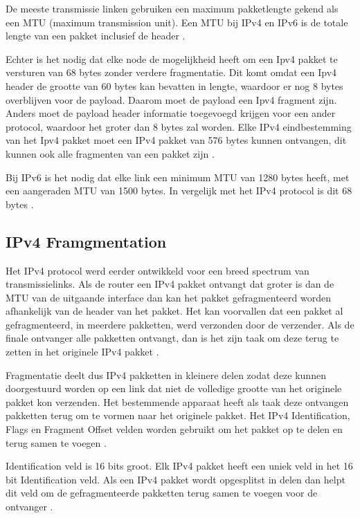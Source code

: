 De meeste transmissie linken gebruiken een maximum pakketlengte gekend als een MTU (maximum transmission unit). Een MTU bij IPv4 en IPv6 is de totale lengte van een pakket inclusief de header \autocite{Graziani2017}. 

Echter is het nodig dat elke node de mogelijkheid heeft om een Ipv4 pakket te versturen van 68 bytes zonder verdere fragmentatie. Dit komt omdat een Ipv4 header de grootte van 60 bytes kan bevatten in lengte, waardoor er nog 8 bytes overblijven voor de payload. Daarom moet de payload een Ipv4 fragment zijn. Anders moet de payload header informatie toegevoegd krijgen voor een ander protocol, waardoor het groter dan 8 bytes zal worden. Elke IPv4 eindbestemming van het Ipv4 pakket moet een IPv4 pakket van 576 bytes kunnen ontvangen, dit kunnen ook alle fragmenten van een pakket zijn \autocite{Graziani2017}.

Bij IPv6 is het nodig dat elke link een minimum MTU van 1280 bytes heeft, met een aangeraden MTU van 1500 bytes. In vergelijk met het IPv4 protocol is dit 68 bytes \autocite{Graziani2017}.

\subsection{IPv4 Framgmentation}

Het IPv4 protocol werd eerder ontwikkeld voor een breed spectrum van transmissielinks. Als de router een IPv4 pakket ontvangt dat groter is dan de MTU van de uitgaande interface dan kan het pakket gefragmenteerd worden afhankelijk van de header van het pakket. Het kan voorvallen dat een pakket al gefragmenteerd, in meerdere pakketten, werd verzonden door de verzender. Als de finale ontvanger alle pakketten ontvangt, dan is het zijn taak om deze terug te zetten in het originele IPv4 pakket \autocite{Graziani2017}.

Fragmentatie deelt dus IPv4 pakketten in kleinere delen zodat deze kunnen doorgestuurd worden op een link dat niet de volledige grootte van het originele pakket kon verzenden. Het bestemmende apparaat heeft als taak deze ontvangen pakketten terug om te vormen naar het originele pakket. Het IPv4 Identification, Flags en Fragment Offset velden worden gebruikt om het pakket op te delen en terug samen te voegen \autocite{Graziani2017}. 

Identification veld is 16 bits groot. Elk IPv4 pakket heeft een uniek veld in het 16 bit Identification veld. Als een IPv4 pakket wordt opgesplitst in delen dan helpt dit veld om de gefragmenteerde pakketten terug samen te voegen voor de ontvanger \autocite{Graziani2017}.

